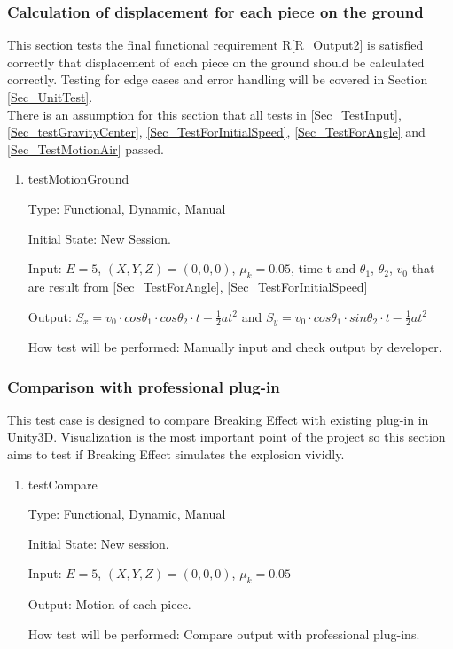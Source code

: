 \documentclass[12pt, titlepage]{article}
\newcommand{\rref}[1]{R\ref{#1}}
\begin{document}
\subsubsection{Calculation of displacement for each piece on the ground}

This section tests the final functional requirement \rref{R_Output2} is satisfied correctly that displacement of each piece on the ground should be calculated correctly. Testing for edge cases and error handling will be covered in Section \ref{Sec_UnitTest}.\\
There is an assumption for this section that all tests in \ref{Sec_TestInput}, \ref{Sec_testGravityCenter}, \ref{Sec_TestForInitialSpeed}, \ref{Sec_TestForAngle} and \ref{Sec_TestMotionAir} passed.

\begin{enumerate}

\item{testMotionGround\\}

Type: Functional, Dynamic, Manual

Initial State: New Session.

Input: $E = 5$, $(X,Y,Z) = (0,0,0)$, $\mu_{k} = 0.05$, time t and $\theta_{1}$, $\theta_{2}$, $v_{0}$ that are result from \ref{Sec_TestForAngle}, \ref{Sec_TestForInitialSpeed}

Output: $S_{x}=v_{0}\cdot cos\theta _{1}\cdot cos\theta _{2}\cdot t-\frac{1}{2}at^{2}$ and $S_{y}=v_{0}\cdot cos\theta _{1}\cdot sin\theta _{2}\cdot t-\frac{1}{2}at^{2}$

How test will be performed: Manually input and check output by developer.

\end{enumerate}

\subsubsection{Comparison with professional plug-in}

This test case is designed to compare Breaking Effect with existing plug-in in Unity3D. Visualization is the most important point of the project so this section aims to test if Breaking Effect simulates the explosion vividly. 

\begin{enumerate}

\item{testCompare\\}

Type: Functional, Dynamic, Manual

Initial State: New session.

Input: $E = 5$, $(X,Y,Z) = (0,0,0)$, $\mu_{k} = 0.05$ 

Output: Motion of each piece.

How test will be performed: Compare output with professional plug-ins. 

\end{enumerate}
\end{document}
